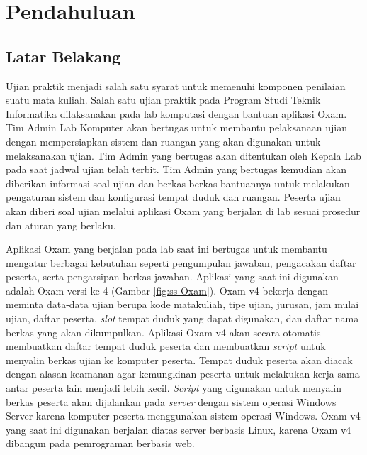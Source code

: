 \chapter{Pendahuluan}
\label{chap:intro}
   
\section{Latar Belakang}
\label{sec:label}
Ujian praktik menjadi salah satu syarat untuk memenuhi komponen penilaian
suatu mata kuliah.
Salah satu ujian praktik pada Program Studi Teknik Informatika 
dilaksanakan pada lab komputasi dengan bantuan aplikasi Oxam.
Tim Admin Lab Komputer akan bertugas untuk membantu
pelaksanaan ujian dengan mempersiapkan sistem dan ruangan yang akan digunakan
untuk melaksanakan ujian. Tim Admin yang bertugas akan ditentukan oleh Kepala Lab pada 
saat jadwal ujian telah terbit. Tim Admin yang bertugas kemudian akan diberikan informasi soal ujian
dan berkas-berkas bantuannya untuk melakukan pengaturan sistem dan konfigurasi tempat duduk dan ruangan.
Peserta ujian akan diberi soal ujian melalui aplikasi
Oxam yang berjalan di lab sesuai prosedur dan aturan yang berlaku.

Aplikasi Oxam yang berjalan pada lab saat ini bertugas untuk
membantu mengatur berbagai kebutuhan seperti pengumpulan jawaban, pengacakan
daftar peserta, serta pengarsipan berkas jawaban. Aplikasi yang saat ini
digunakan adalah Oxam versi ke-4 (Gambar \ref{fig:ss-Oxam}). Oxam v4 bekerja dengan meminta
data-data ujian berupa kode matakuliah, tipe ujian, jurusan, jam mulai ujian, daftar
peserta, \textit{slot} tempat duduk yang dapat digunakan, dan daftar nama berkas
yang akan dikumpulkan. Aplikasi Oxam v4 akan secara otomatis membuatkan daftar
tempat duduk peserta dan membuatkan \textit{script} untuk
menyalin berkas ujian ke komputer peserta. Tempat duduk peserta akan diacak dengan
alasan keamanan agar kemungkinan peserta untuk melakukan kerja sama antar peserta lain
menjadi lebih kecil. \textit{Script} yang digunakan untuk menyalin berkas peserta akan
dijalankan pada \textit{server} dengan sistem operasi Windows Server karena komputer peserta
menggunakan sistem operasi Windows. Oxam v4 yang saat ini digunakan berjalan diatas server
berbasis Linux, karena Oxam v4 dibangun pada pemrograman berbasis web.

